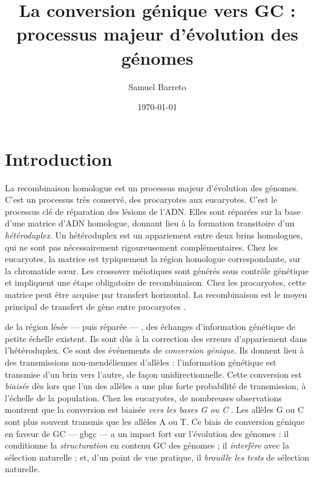 \documentclass[11pt, oneside]{scrartcl}
\author{Samuel Barreto}
\date{\today}
\title{La conversion génique vers GC : processus majeur d'évolution des génomes}
\begin{document}


\section*{Introduction}
\label{sec:orgheadline1}
La recombinaison homologue est un processus majeur d'évolution des génomes.
C'est un processus très conservé, des procaryotes aux
eucaryotes\cite{cromie_recombination_2001}. C'est le processus clé de réparation
des lésions de l'ADN. Elles sont réparées sur la base d'une matrice d'ADN
homologue, donnant lieu à la formation transitoire d'un \emph{hétéroduplex}. Un
hétéroduplex est un appariement entre deux brins homologues, qui ne sont pas
nécessairement rigoureusement complémentaires. Chez les eucaryotes, la matrice
est typiquement la région homologue correspondante, sur la chromatide sœur. Les
crossover méiotiques sont générés sous contrôle génétique et impliquent une
étape obligatoire de recombinaison\cite{mancera_high-resolution_2008}. Chez les
procaryotes, cette matrice peut être acquise par transfert horizontal. La
recombinaison est le moyen principal de transfert de gène entre procaryotes
\cite{vos_rates_2015}.

 de la région lésée --- puis réparée --- , des échanges
d'information génétique de petite échelle existent\cite{duret_biased_2009}. Ils
sont dûs à la correction des erreurs d'appariement dans l'hétéroduplex. Ce sont
des événements de \emph{conversion génique}. Ils donnent lieu à des transmissions
non-mendéliennes d'allèles : l'information génétique est transmise d'un brin
vers l'autre, de façon unidirectionnelle. Cette conversion est \emph{biaisée} dès
lors que l'un des allèles a une plus forte probabilité de transmission, à
l'échelle de la population. Chez les eucaryotes, de nombreuses observations
montrent que la conversion est biaisée \emph{vers les bases G ou C}
\cite{pessia_evidence_2012, mancera_high-resolution_2008, duret_impact_2008}.
Les allèles G ou C sont plus souvent transmis que les allèles A ou T. Ce biais
de conversion génique en faveur de GC --- \ac{gbgc} --- a un impact fort sur
l'évolution des génomes : il conditionne la \emph{structuration} en contenu GC des
génomes\cite{duret_impact_2008} ; il \emph{interfère} avec la sélection
naturelle\cite{galtier_gc-biased_2009} ; et, d'un point de vue pratique, il
\emph{brouille les tests} de sélection naturelle\cite{ratnakumar_detecting_2010}.
\end{document}
